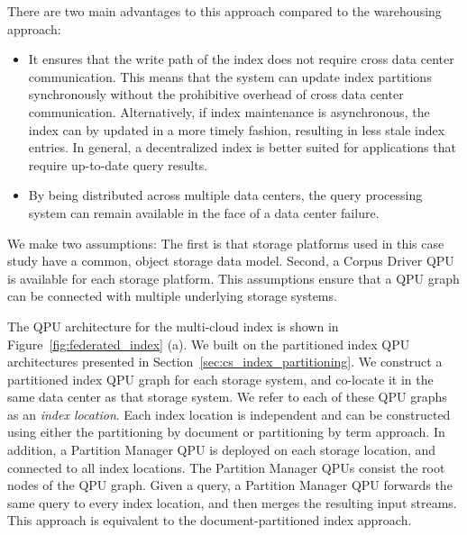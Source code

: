 There are two main advantages to this approach compared to the warehousing approach:
\begin{itemize}
  \item It ensures that the write path of the index does not require cross data center communication.
  This means that the system can update index partitions synchronously without the prohibitive overhead of
  cross data center communication.
  Alternatively, if index maintenance is asynchronous,
  the index can by updated in a more timely fashion, resulting in less stale index entries.
  In general, a decentralized index is better suited for applications that require up-to-date query results.

  \item By being distributed across multiple data centers,
  the query processing system can remain available in the face of a data center failure.
\end{itemize}

We make two assumptions:
The first is that storage platforms used in this case study have a common, object storage data model.
Second, a Corpus Driver QPU is available for each storage platform.
This assumptions ensure that a QPU graph can be connected with multiple underlying storage systems.

\medskip
\noindent
The QPU architecture for the multi-cloud index is shown in Figure~\ref{fig:federated_index} (a).
We built on the partitioned index QPU architectures presented in Section~\ref{sec:cs_index_partitioning}.
We construct a partitioned index QPU graph for each storage system, and co-locate it in the same data center as that
storage system.
We refer to each of these QPU graphs as an \textit{index location}.
Each index location is independent and can be constructed using either the partitioning by document or partitioning by
term approach.
In addition, a Partition Manager QPU is deployed on each storage location,
and connected to all index locations.
The Partition Manager QPUs consist the root nodes of the QPU graph.
Given a query, a Partition Manager QPU forwards the same query to every index location,
and then merges the resulting input streams.
This approach is equivalent to the document-partitioned index approach.

